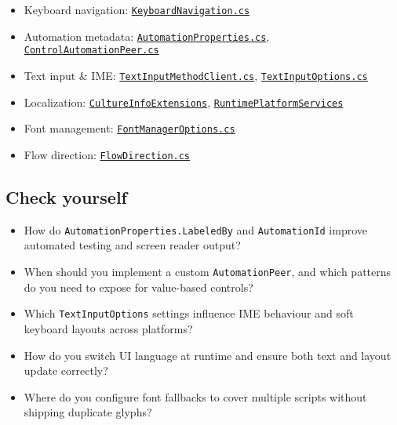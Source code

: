 \begin{itemize}
\tightlist
\item
  Keyboard navigation:
  \href{https://github.com/AvaloniaUI/Avalonia/blob/master/src/Avalonia.Base/Input/KeyboardNavigation.cs}{\passthrough{\lstinline!KeyboardNavigation.cs!}}
\item
  Automation metadata:
  \href{https://github.com/AvaloniaUI/Avalonia/blob/master/src/Avalonia.Controls/Automation/AutomationProperties.cs}{\passthrough{\lstinline!AutomationProperties.cs!}},
  \href{https://github.com/AvaloniaUI/Avalonia/blob/master/src/Avalonia.Controls/Automation/Peers/ControlAutomationPeer.cs}{\passthrough{\lstinline!ControlAutomationPeer.cs!}}
\item
  Text input \& IME:
  \href{https://github.com/AvaloniaUI/Avalonia/blob/master/src/Avalonia.Base/Input/TextInput/TextInputMethodClient.cs}{\passthrough{\lstinline!TextInputMethodClient.cs!}},
  \href{https://github.com/AvaloniaUI/Avalonia/blob/master/src/Avalonia.Base/Input/TextInput/TextInputOptions.cs}{\passthrough{\lstinline!TextInputOptions.cs!}}
\item
  Localization:
  \href{https://github.com/AvaloniaUI/Avalonia/blob/master/src/Avalonia.Base/Localization/CultureInfoExtensions.cs}{\passthrough{\lstinline!CultureInfoExtensions!}},
  \href{https://github.com/AvaloniaUI/Avalonia/blob/master/src/Avalonia.Base/Runtime/PlatformServices.cs}{\passthrough{\lstinline!RuntimePlatformServices!}}
\item
  Font management:
  \href{https://github.com/AvaloniaUI/Avalonia/blob/master/src/Avalonia.Base/Media/FontManagerOptions.cs}{\passthrough{\lstinline!FontManagerOptions.cs!}}
\item
  Flow direction:
  \href{https://github.com/AvaloniaUI/Avalonia/blob/master/src/Avalonia.Visuals/FlowDirection.cs}{\passthrough{\lstinline!FlowDirection.cs!}}
\end{itemize}

\subsection{Check yourself}\label{check-yourself-13}

\begin{itemize}
\tightlist
\item
  How do \passthrough{\lstinline!AutomationProperties.LabeledBy!} and
  \passthrough{\lstinline!AutomationId!} improve automated testing and
  screen reader output?
\item
  When should you implement a custom
  \passthrough{\lstinline!AutomationPeer!}, and which patterns do you
  need to expose for value-based controls?
\item
  Which \passthrough{\lstinline!TextInputOptions!} settings influence
  IME behaviour and soft keyboard layouts across platforms?
\item
  How do you switch UI language at runtime and ensure both text and
  layout update correctly?
\item
  Where do you configure font fallbacks to cover multiple scripts
  without shipping duplicate glyphs?
\end{itemize}

